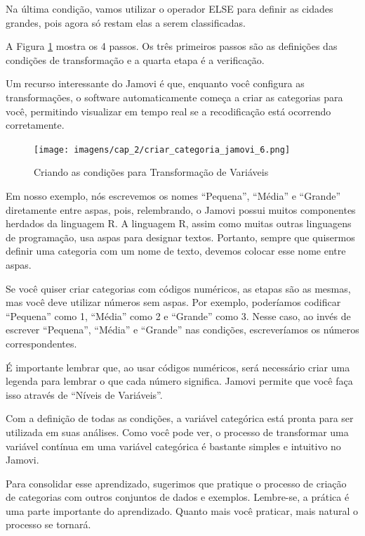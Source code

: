 Na última condição, vamos utilizar o operador ELSE para definir as cidades grandes, pois agora só restam elas a serem classificadas. 

A Figura \ref{fig:criar_categoria_jamovi_6} mostra os 4 passos. Os três primeiros passos são as definições das condições de transformação e a quarta etapa é a verificação.

Um recurso interessante do Jamovi é que, enquanto você configura as transformações, o software automaticamente começa a criar as categorias para você, permitindo visualizar em tempo real se a recodificação está ocorrendo corretamente. 

\begin{figure}[H]
    \centering
    \caption{Criando as condições para Transformação de Variáveis}
    \texttt{[image: imagens/cap\_2/criar\_categoria\_jamovi\_6.png]}
    \label{fig:criar_categoria_jamovi_6}
\end{figure}

Em nosso exemplo, nós escrevemos os nomes ``Pequena'', ``Média'' e ``Grande'' diretamente entre aspas, pois, relembrando, o Jamovi possui muitos componentes herdados da linguagem R. A linguagem R, assim como muitas outras linguagens de programação, usa aspas para designar textos. Portanto, sempre que quisermos definir uma categoria com um nome de texto, devemos colocar esse nome entre aspas.

Se você quiser criar categorias com códigos numéricos, as etapas são as mesmas, mas você deve utilizar números sem aspas. Por exemplo, poderíamos codificar ``Pequena'' como 1, ``Média'' como 2 e ``Grande'' como 3. Nesse caso, ao invés de escrever ``Pequena'', ``Média'' e ``Grande'' nas condições, escreveríamos os números correspondentes.

É importante lembrar que, ao usar códigos numéricos, será necessário criar uma legenda para lembrar o que cada número significa. Jamovi permite que você faça isso através de ``Níveis de Variáveis''.

Com a definição de todas as condições, a variável categórica está pronta para ser utilizada em suas análises. Como você pode ver, o processo de transformar uma variável contínua em uma variável categórica é bastante simples e intuitivo no Jamovi.

Para consolidar esse aprendizado, sugerimos que pratique o processo de criação de categorias com outros conjuntos de dados e exemplos. Lembre-se, a prática é uma parte importante do aprendizado. Quanto mais você praticar, mais natural o processo se tornará.

